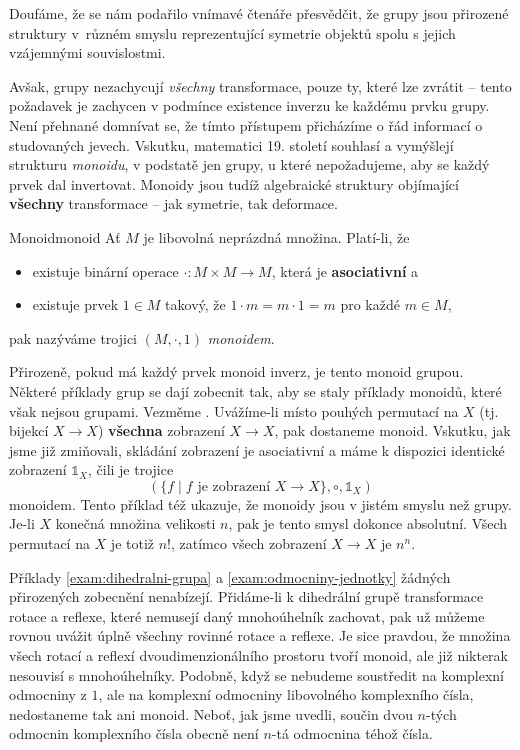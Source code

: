 Doufáme, že se nám podařilo vnímavé čtenáře přesvědčit, že grupy jsou přirozené
struktury v~různém smyslu reprezentující symetrie objektů spolu s jejich
vzájemnými souvislostmi.

Avšak, grupy nezachycují \emph{všechny} transformace, pouze ty, které lze
zvrátit -- tento požadavek je zachycen v podmínce existence inverzu ke každému
prvku grupy. Není přehnané domnívat se, že tímto přístupem přicházíme o řád
informací o studovaných jevech. Vskutku, matematici 19. století souhlasí a
vymýšlejí strukturu \emph{monoidu}, v podstatě jen grupy, u které nepožadujeme,
aby se každý prvek dal invertovat. Monoidy jsou tudíž algebraické struktury
objímající \textbf{všechny} transformace -- jak symetrie, tak deformace.

\begin{definition}{Monoid}{monoid}
 Ať $M$ je libovolná neprázdná množina. Platí-li, že
 \begin{itemize}
  \item existuje binární operace $ \cdot :M \times M \to M$, která je
   \textbf{asociativní} a
  \item existuje prvek $1 \in M$ takový, že $1 \cdot m = m \cdot 1 = m$ pro
   každé $m \in M$,
 \end{itemize}
 pak nazýváme trojici $(M, \cdot ,1)$ \emph{monoidem}.
\end{definition}

Přirozeně, pokud má každý prvek monoid inverz, je tento monoid grupou. Některé
příklady grup se dají zobecnit tak, aby se staly příklady monoidů, které však
nejsou grupami. Vezměme . Uvážíme-li místo
pouhých permutací na $X$ (tj. bijekcí $X \to X$) \textbf{všechna} zobrazení $X
\to X$, pak dostaneme monoid. Vskutku, jak jsme již zmiňovali, skládání
zobrazení je asociativní a máme k dispozici identické zobrazení $\mathds{1}_X$,
čili je trojice
\[
 (\{f \mid f \text{ je zobrazení } X \to X\}, \circ ,\mathds{1}_X)
\]
monoidem. Tento příklad též ukazuje, že monoidy jsou v jistém smyslu 
než grupy. Je-li $X$ konečná množina velikosti $n$, pak je tento smysl dokonce
absolutní. Všech permutací na $X$ je totiž $n!$, zatímco všech zobrazení $X \to
X$ je $n^{n}$.

Příklady \ref{exam:dihedralni-grupa} a \ref{exam:odmocniny-jednotky} žádných
přirozených zobecnění nenabízejí. Přidáme-li k dihedrální grupě transformace
rotace a reflexe, které nemusejí daný mnohoúhelník zachovat, pak už můžeme
rovnou uvážit úplně všechny rovinné rotace a reflexe. Je sice pravdou, že
množina všech rotací a reflexí dvoudimenzionálního prostoru tvoří monoid, ale
již nikterak nesouvisí s mnohoúhelníky. Podobně, když se nebudeme soustředit na
komplexní odmocniny z $1$, ale na komplexní odmocniny libovolného komplexního
čísla, nedostaneme tak ani monoid. Neboť, jak jsme uvedli, součin dvou $n$-tých
odmocnin komplexního čísla obecně není $n$-tá odmocnina téhož čísla.


